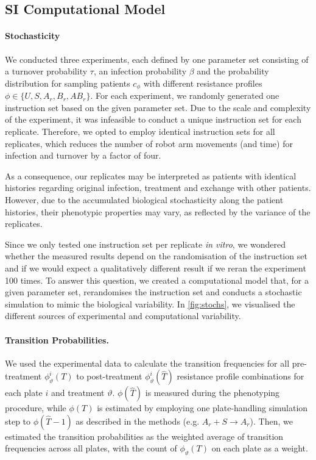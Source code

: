 \subsection{SI Computational Model\label{ssec: model}}
\paragraph{Stochasticity}
We conducted three experiments, each defined by one parameter set consisting of a turnover probability $\tau$, an infection probability $\beta$ and the probability distribution for sampling patients $c_\phi$ with different resistance profiles $\phi \in \{U, S, A_r, B_r, AB_r\}$.
For each experiment, we randomly generated one instruction set based on the given parameter set.
Due to the scale and complexity of the experiment, it was infeasible to conduct a unique instruction set for each replicate.
Therefore, we opted to employ identical instruction sets for all replicates, which reduces the number of robot arm movements (and time) for infection and turnover by a factor of four.

As a consequence, our replicates may be interpreted as patients with identical histories regarding original infection, treatment and exchange with other patients.
However, due to the accumulated biological stochasticity along the patient histories, their phenotypic properties may vary, as reflected by the variance of the replicates.

Since we only tested one instruction set per replicate \textit{in vitro}, we wondered whether the measured results depend on the randomisation of the instruction set and if we would expect a qualitatively different result if we reran the experiment 100 times.
To answer this question, we created a computational model that, for a given parameter set, rerandomises the instruction set and conducts a stochastic simulation to mimic the biological variability.
In \autoref{fig:stochs}, we visualised the different sources of experimental and computational variability.

\paragraph{Transition Probabilities.}
We used the experimental data to calculate the transition frequencies for all pre-treatment $\phi^i_\vartheta(T)$ to post-treatment $\phi^i_\vartheta(\hat{T})$ resistance profile combinations for each plate $i$ and treatment $\vartheta$.
$\phi(\hat{T})$ is measured during the phenotyping procedure, while $\phi(T)$ is estimated by employing one plate-handling simulation step to $\phi(\hat{T}-1)$ as described in the methods (e.g. $A_r  + S \rightarrow A_r$).
Then, we estimated the transition probabilities as the weighted average of transition frequencies across all plates, with the count of $\phi_\vartheta(T)$ on each plate as a weight.

